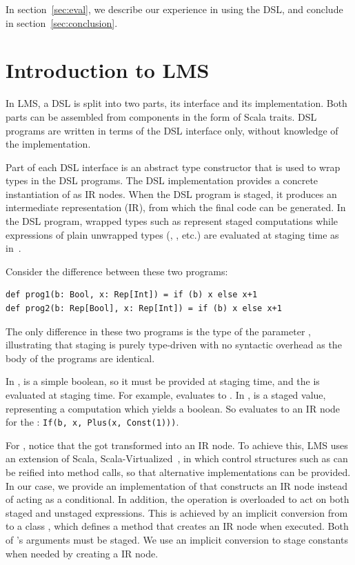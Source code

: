 \documentclass[runningheads,a4paper]{llncs}
\begin{document}
In section~\ref{sec:eval}, we describe our experience in using the DSL, and conclude in section~\ref{sec:conclusion}.


\section{Introduction to LMS}

In LMS, a DSL is split into two parts, its
interface and its implementation. Both parts can be assembled from
components in the form of Scala traits. DSL programs are written in
terms of the DSL interface only, without knowledge of the
implementation.

Part of each DSL interface is an abstract type constructor
 that is used to wrap types in the DSL programs. The DSL
implementation provides a concrete instantiation of  as IR
nodes. When the DSL program is staged, it produces an intermediate
representation (IR), from which the final code can be generated. In
the DSL program, wrapped types such as  represent
staged computations while expressions of plain unwrapped types
(, , etc.) are evaluated at staging time as
in~\cite{finally-tagless,polymorphic-embedding}.

Consider the difference between these two programs:
\begin{lstlisting}
def prog1(b: Bool, x: Rep[Int]) = if (b) x else x+1
def prog2(b: Rep[Bool], x: Rep[Int]) = if (b) x else x+1
\end{lstlisting}

The only difference in these two programs is the type of the parameter
, illustrating that staging is purely type-driven with no
syntactic overhead as the body of the programs are identical.

In ,  is a simple boolean, so it must be provided
at staging time, and the  is evaluated at staging time. For
example,  evaluates to . In ,
 is a staged value, representing a computation which yields a
boolean. So  evaluates to an IR node for the :
{\tt\small If(b, x, Plus(x, Const(1)))}.

For , notice that the  got transformed into an IR
node. To achieve this, LMS uses an extension of Scala,
Scala-Virtualized~\cite{scala-virtualized}, in which control
structures such as  can be reified into method calls, so that
alternative implementations can be provided. In our case, we provide an
implementation of  that constructs an IR node instead of
acting as a conditional. In addition, the \code{+} operation is
overloaded to act on both staged and unstaged expressions. This is
achieved by an implicit conversion from  to a class
, which defines a \code{+} method that creates an IR node
 when executed. Both of 's arguments must be
staged. We use an implicit conversion to stage constants when needed
by creating a  IR node.
\end{document}
